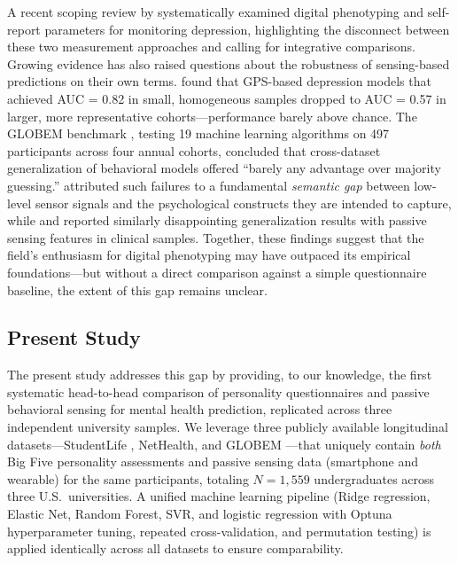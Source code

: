 \documentclass[12pt, a4paper]{article}
\begin{document}
A recent scoping review by \citet{busshart2026scoping} systematically examined digital phenotyping and self-report parameters for monitoring depression, highlighting the disconnect between these two measurement approaches and calling for integrative comparisons. Growing evidence has also raised questions about the robustness of sensing-based predictions on their own terms. \citet{muller2021depression} found that GPS-based depression models that achieved AUC = 0.82 in small, homogeneous samples dropped to AUC = 0.57 in larger, more representative cohorts---performance barely above chance. The GLOBEM benchmark \citep{xu2022globem}, testing 19 machine learning algorithms on 497 participants across four annual cohorts, concluded that cross-dataset generalization of behavioral models offered ``barely any advantage over majority guessing.'' \citet{dasswain2022semantic} attributed such failures to a fundamental \textit{semantic gap} between low-level sensor signals and the psychological constructs they are intended to capture, while \citet{currey2022digital} and \citet{adler2022machine} reported similarly disappointing generalization results with passive sensing features in clinical samples. Together, these findings suggest that the field's enthusiasm for digital phenotyping may have outpaced its empirical foundations---but without a direct comparison against a simple questionnaire baseline, the extent of this gap remains unclear.

\subsection{Present Study}

The present study addresses this gap by providing, to our knowledge, the first systematic head-to-head comparison of personality questionnaires and passive behavioral sensing for mental health prediction, replicated across three independent university samples. We leverage three publicly available longitudinal datasets---StudentLife \citep{wang2014studentlife}, NetHealth, and GLOBEM \citep{xu2022globem}---that uniquely contain \textit{both} Big Five personality assessments and passive sensing data (smartphone and wearable) for the same participants, totaling $N = 1{,}559$ undergraduates across three U.S.\ universities. A unified machine learning pipeline (Ridge regression, Elastic Net, Random Forest, SVR, and logistic regression with Optuna hyperparameter tuning, repeated cross-validation, and permutation testing) is applied identically across all datasets to ensure comparability.
\end{document}
